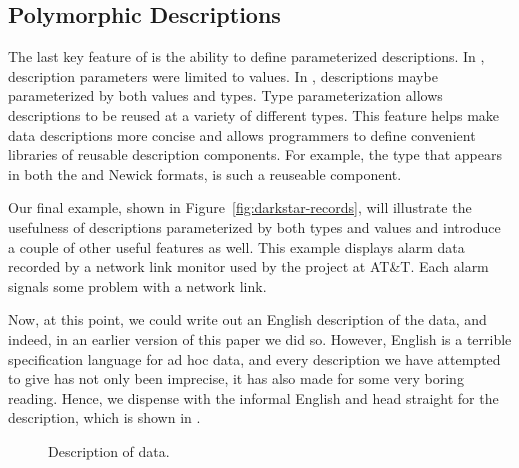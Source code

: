 \subsection{Polymorphic Descriptions}

The last key feature of \padsml{} is the ability to define
parameterized descriptions.  In \padsc, description parameters were
limited to values.  In \padsml, descriptions maybe parameterized by
both values and types.  Type parameterization allows descriptions to
be reused at a variety of different types.  This feature helps make
data descriptions more concise and allows programmers to define
convenient libraries of reusable description components. For example,
the  type that appears in both the \dibbler{} and Newick
formats, is such a reuseable component.

Our final example, shown in Figure~\ref{fig:darkstar-records}, will
illustrate the usefulness of descriptions parameterized by both types
and values and introduce a couple of other useful features as well.
This example displays alarm data recorded by a network link monitor
used by the \darkstar{} project at AT\&T.  Each alarm signals some
problem with a network link.

Now, at this point, we could write out an English description
of the \darkstar{} data, and indeed, in an earlier version of this paper
we did so.  However, English is a terrible specification language
for ad hoc data, and every description we have attempted to give has not 
only been imprecise, it has also made for some very 
boring reading.  Hence, we dispense with the informal
English and head straight for the \padsml{} description,
which is shown in .

\begin{figure}
  \centering
  
  \caption{Description of \darkstar{} data.}
  \label{fig:darkstar-ml}
\end{figure}


